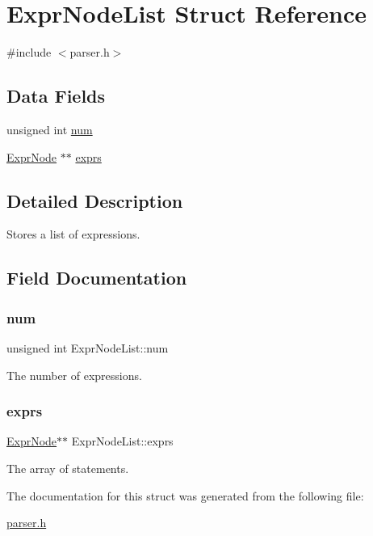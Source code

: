 \hypertarget{struct_expr_node_list}{}\section{Expr\+Node\+List Struct Reference}
\label{struct_expr_node_list}


{\ttfamily \#include $<$parser.\+h$>$}

\subsection*{Data Fields}
\begin{DoxyCompactItemize}
\item 
unsigned int \hyperlink{struct_expr_node_list_a60f9bbe230725287369033df733a2b04}{num}
\item 
\hyperlink{struct_expr_node}{Expr\+Node} $\ast$$\ast$ \hyperlink{struct_expr_node_list_a10ae95f2facec652ba79e0bb5c9298c1}{exprs}
\end{DoxyCompactItemize}


\subsection{Detailed Description}
Stores a list of expressions. 

\subsection{Field Documentation}
\mbox{\label{struct_expr_node_list_a60f9bbe230725287369033df733a2b04}} 
\subsubsection{\texorpdfstring{num}{num}}
{\footnotesize\ttfamily unsigned int Expr\+Node\+List\+::num}

The number of expressions. \mbox{\label{struct_expr_node_list_a10ae95f2facec652ba79e0bb5c9298c1}} 
\subsubsection{\texorpdfstring{exprs}{exprs}}
{\footnotesize\ttfamily \hyperlink{struct_expr_node}{Expr\+Node}$\ast$$\ast$ Expr\+Node\+List\+::exprs}

The array of statements. 

The documentation for this struct was generated from the following file\+:\begin{DoxyCompactItemize}
\item 
\hyperlink{parser_8h}{parser.\+h}\end{DoxyCompactItemize}
